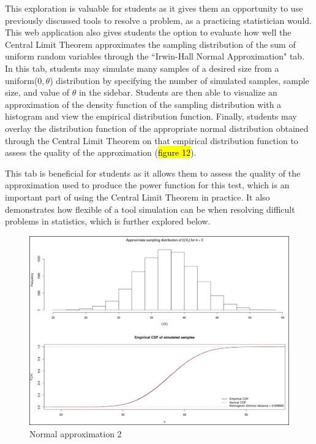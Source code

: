 \documentclass{TISE}
\begin{document}
This exploration is valuable for students as it gives them an opportunity to use previously discussed tools to resolve a problem, as a practicing statistician would. This web application also gives students the option to evaluate how well the Central Limit Theorem approximates the sampling distribution of the sum of uniform random variables through the ``Irwin-Hall Normal Approximation" tab. In this tab, students may simulate many samples of a desired size from a uniform($0, \theta$) distribution by specifying the number of simulated samples, sample size, and value of $\theta$ in the sidebar. Students are then able to visualize an approximation of the density function of the sampling distribution with a histogram and view the empirical distribution function. Finally, students may overlay the distribution function of the appropriate normal distribution obtained through the Central Limit Theorem on that empirical distribution function to assess the quality of the approximation (\hl{figure 12}). 

This tab is beneficial for students as it allows them to assess the quality of the approximation used to produce the power function for this test, which is an important part of using the Central Limit Theorem in practice. It also demonstrates how flexible of a tool simulation can be when resolving difficult problems in statistics, which is further explored below. 

\begin{figure}[H]
	\centering
	\includegraphics[width=\textwidth]{normapprox2.png}
	\caption{Normal approximation 2}
\end{figure}
\end{document}
